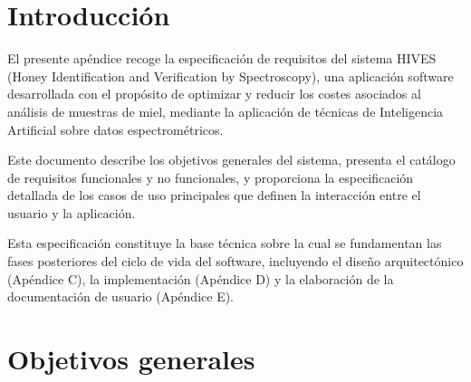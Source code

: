 
\section{Introducción}

El presente apéndice recoge la especificación de requisitos del sistema HIVES (Honey Identification and Verification by Spectroscopy), una aplicación software desarrollada con el propósito de optimizar y reducir los costes asociados al análisis de muestras de miel, mediante la aplicación de técnicas de Inteligencia Artificial sobre datos espectrométricos.

Este documento describe los objetivos generales del sistema, presenta el catálogo de requisitos funcionales y no funcionales, y proporciona la especificación detallada de los casos de uso principales que definen la interacción entre el usuario y la aplicación.

Esta especificación constituye la base técnica sobre la cual se fundamentan las fases posteriores del ciclo de vida del software, incluyendo el diseño arquitectónico (Apéndice C), la implementación (Apéndice D) y la elaboración de la documentación de usuario (Apéndice E).

\section{Objetivos generales}

